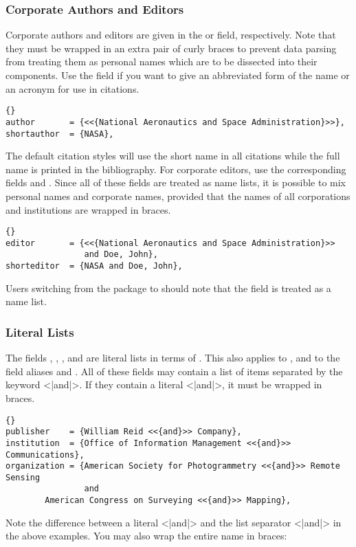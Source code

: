 \documentclass{ltxdockit}[2011/03/25]
\newcommand*{\biblatex}{\sty{biblatex}\xspace}
\begin{document}
\subsubsection{Corporate Authors and Editors}
\label{bib:use:inc}

Corporate authors and editors are given in the  or  field, respectively. Note that they must be wrapped in an extra pair of curly braces to prevent data parsing from treating them as personal names which are to be dissected into their components. Use the  field if you want to give an abbreviated form of the name or an acronym for use in citations.

\begin{lstlisting}[style=bibtex]{}
author       = {<<{National Aeronautics and Space Administration}>>},
shortauthor  = {NASA},
\end{lstlisting}
%
The default citation styles will use the short name in all citations while the full name is printed in the bibliography. For corporate editors, use the corresponding fields  and . Since all of these fields are treated as name lists, it is possible to mix personal names and corporate names, provided that the names of all corporations and institutions are wrapped in braces.

\begin{lstlisting}[style=bibtex]{}
editor       = {<<{National Aeronautics and Space Administration}>>
                and Doe, John},
shorteditor  = {NASA and Doe, John},
\end{lstlisting}
%
Users switching from the  package to \biblatex should note that the  field is treated as a name list.

\subsubsection{Literal Lists}
\label{bib:use:and}

The fields , , , and  are literal lists in terms of . This also applies to ,  and to the field aliases  and . All of these fields may contain a list of items separated by the keyword <|and|>. If they contain a literal <|and|>, it must be wrapped in braces.

\begin{lstlisting}[style=bibtex]{}
publisher    = {William Reid <<{and}>> Company},
institution  = {Office of Information Management <<{and}>> Communications},
organization = {American Society for Photogrammetry <<{and}>> Remote Sensing
                and
		American Congress on Surveying <<{and}>> Mapping},
\end{lstlisting}
%
Note the difference between a literal <|{and}|> and the list separator <|and|> in the above examples. You may also wrap the entire name in braces:
\end{document}
